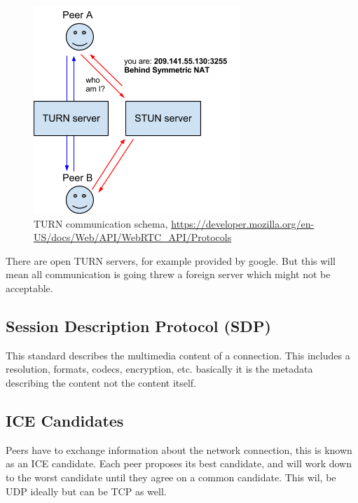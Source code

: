 \begin{figure}[H]
	\includegraphics[scale=0.5]{images/webrtc-turn.png}
	\centering
	\caption{TURN communication schema, \url{https://developer.mozilla.org/en-US/docs/Web/API/WebRTC_API/Protocols}}
	\label{fig:TURN}
\end{figure}

There are open TURN servers, for example provided by google. But this will mean all communication is going threw a foreign server which might not be acceptable.

\subsection{Session Description Protocol (SDP)}
This standard describes the multimedia content of a connection. This includes a resolution, formats, codecs, encryption, etc. basically it is the metadata describing the content not the content itself.

\subsection{ICE Candidates}
Peers have to exchange information about the network connection, this is known as an ICE candidate. Each peer proposes its best candidate, and will work down to the worst candidate until they agree on a common candidate. This wil, be UDP ideally but can be TCP as well.

